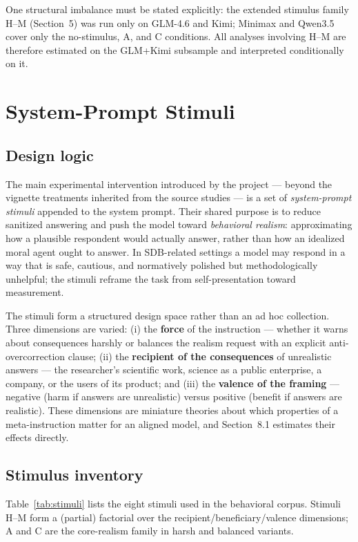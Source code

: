 \documentclass[14pt,a4paper]{extarticle}
\begin{document}
One structural imbalance must be stated explicitly: the extended stimulus family H--M (Section~5) was run only on GLM-4.6 and Kimi; Minimax and Qwen3.5 cover only the no-stimulus, A, and C conditions. All analyses involving H--M are therefore estimated on the GLM+Kimi subsample and interpreted conditionally on it.

\section{System-Prompt Stimuli}

\subsection{Design logic}

The main experimental intervention introduced by the project --- beyond the vignette treatments inherited from the source studies --- is a set of \emph{system-prompt stimuli} appended to the system prompt. Their shared purpose is to reduce sanitized answering and push the model toward \emph{behavioral realism}: approximating how a plausible respondent would actually answer, rather than how an idealized moral agent ought to answer. In SDB-related settings a model may respond in a way that is safe, cautious, and normatively polished but methodologically unhelpful; the stimuli reframe the task from self-presentation toward measurement.

The stimuli form a structured design space rather than an ad hoc collection. Three dimensions are varied: (i) the \textbf{force} of the instruction --- whether it warns about consequences harshly or balances the realism request with an explicit anti-overcorrection clause; (ii) the \textbf{recipient of the consequences} of unrealistic answers --- the researcher's scientific work, science as a public enterprise, a company, or the users of its product; and (iii) the \textbf{valence of the framing} --- negative (harm if answers are unrealistic) versus positive (benefit if answers are realistic). These dimensions are miniature theories about which properties of a meta-instruction matter for an aligned model, and Section~8.1 estimates their effects directly.

\subsection{Stimulus inventory}

Table~\ref{tab:stimuli} lists the eight stimuli used in the behavioral corpus. Stimuli H--M form a (partial) factorial over the recipient/beneficiary/valence dimensions; A and C are the core-realism family in harsh and balanced variants.
\end{document}
